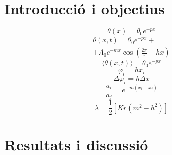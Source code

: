 \documentclass[12pt,twosides,onecolumn,openany]{article}
\begin{document}
\begin{multicols}{2}
\section{Introducció i objectius}
\begin{equation}\label{sol_estacionaria}
  \theta(x) = \theta_0e^{-px}
\end{equation}
\begin{multline}\label{sol_permanent}
  \theta(x,t) = \theta_0e^{-px} +\\
   + A_0e^{-mx}\cos{\left( \frac{2\pi}{\tau} -hx \right)} 
\end{multline}
\begin{equation}\label{prom_temp}
  \langle \theta(x,t) \rangle = \theta_0e^{-px}  
\end{equation}
\begin{equation}\label{desfasament}
  \varphi_i = hx_i
\end{equation}
\begin{equation}\label{increment_desfasament}
  \Delta \varphi_i = h\Delta x
\end{equation}
\begin{equation}\label{trobar_m}
  \frac{a_i}{a_j} = e^{-m(x_i-x_j)}
\end{equation}
\begin{equation}\label{valor_lambda}
  \lambda = \frac{1}{2}[Kr(m^2 - h^2)]
\end{equation}
\section{Resultats i discussió}

\end{multicols}
\end{document}
